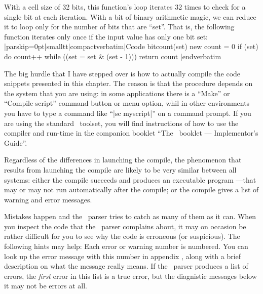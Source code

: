With a cell size of 32 bits, this function's loop iterates 32 times to check for
a single bit at each iteration. With a bit of binary arithmetic magic, we can
reduce it to loop only for the number of bits that are ``set''. That is, the
following function iterates only once if the input value has only one bit set:
\listingx\verbatim|parskip=0pt|smalltt|compactverbatim|Ccode
bitcount(set)
    {
    new count = 0
    if (set)
        do
            count++
        while ((set = set & (set - 1)))
    return count
    }
|endverbatim\endlistingx



\dingbatseparator

The big hurdle that I have stepped over is how to actually compile the code
snippets presented in this chapter. The reason is that the procedure depends
on the system that you are using: in some applications there is a ``{\tensans Make}''
or ``{\tensans Compile script}'' command button or menu option, whil in other
environments you have to type a command like ``|sc myscript|'' on a command prompt.
If you are using the standard \Small\ toolset, you will find instructions of how
to use the compiler and run-time in the companion booklet ``The \Small\ booklet
--- Implementor's Guide''.

Regardless of the differences in launching the compile, the phenomenon that
results from launching the compile are likely to be very similar between all
systems:
\beginlist{1em}\compactlist
\list{\lbullet}
  either the compile succeeds and produces an executable program ---that may or
  may not run automatically after the compile;
\list{\lbullet}
  or the compile gives a list of warning and error messages.
\endlist

Mistakes happen and the \Small\ parser tries to catch as many of them as it can.
When you inspect the code that the \Small\ parser complains about, it may on
occasion be rather difficult for you to see why the code is erroneous (or suspicious).
The following hints may help:
\beginlist{1em}
\list{\lbullet}
  Each error or warning number is numbered. You can look up the error message
  with this number in appendix , along with
  a brief description on what the message really means.
\list{\lbullet}
  If the \Small\ parser produces a list of errors, the {\it first\/} error in
  this list is a true error, but the diagnistic messages below it may not be
  errors at all.

